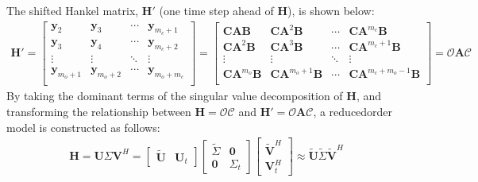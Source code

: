 \documentclass[letterpaper,10pt,english]{sphinxmanual}
\begin{document}
\sphinxAtStartPar
The shifted Hankel matrix, \(\mathbf{H'}\) (one time step ahead of
\(\mathbf{H}\)), is shown below:
\begin{equation*}
\begin{split}\mathbf{H'}
=
\begin{bmatrix}
    \mathbf{y}_{2}       & \mathbf{y}_{3}        & \cdots   & \mathbf{y}_{m_{c}+1}        \\
    \mathbf{y}_{3}       & \mathbf{y}_{4}        & \cdots   & \mathbf{y}_{m_{c}+2}        \\
    \vdots               & \vdots                & \ddots   & \vdots                      \\
    \mathbf{y}_{m_{o}+1} & \mathbf{y}_{m_{o}+2}  & \cdots   & \mathbf{y}_{m_{o}+m_{c}}    \\
\end{bmatrix}
=
\begin{bmatrix}
    \mathbf{CAB}                    & \mathbf{CA}^{2}\mathbf{B}     & \cdots  & \mathbf{CA}^{m_{c}}\mathbf{B}          \\
    \mathbf{CA}^{2}\mathbf{B}       & \mathbf{CA}^{3}\mathbf{B}     & \cdots  & \mathbf{CA}^{m_{c}+1}\mathbf{B}        \\
    \vdots                          & \vdots                        & \ddots  & \vdots                                 \\
    \mathbf{CA}^{m_{o}}\mathbf{B}   & \mathbf{CA}^{m_{o}+1}\mathbf{B} & \cdots  & \mathbf{CA}^{m_{c}+m_{o}-1}\mathbf{B}\\
\end{bmatrix}
=
\mathbf{\mathcal{O}A\mathcal{C}}\end{split}
\end{equation*}
\sphinxAtStartPar
By taking the dominant terms of the singular value decomposition
of \(\mathbf{H}\), and transforming the relationship between
\(\mathbf{H} = \mathbf{\mathcal{OC}}\) and
\(\mathbf{H'} = \mathbf{\mathcal{O}A\mathcal{C}}\), a reduced\sphinxhyphen{}order
model is constructed as follows:
\begin{equation*}
\begin{split}\mathbf{H} = \mathbf{U}\Sigma\mathbf{V}^{H} =
\begin{bmatrix} \mathbf{\tilde{U}} & \mathbf{U}_{t} \end{bmatrix}
\begin{bmatrix} \tilde{\Sigma} & \mathbf{0} \\ \mathbf{0} & \Sigma_{t} \end{bmatrix}
\begin{bmatrix} \mathbf{\tilde{V}}^{H} \\ \mathbf{V}_{t}^{H} \end{bmatrix}
\approx \mathbf{\tilde{U}}\tilde{\Sigma}\mathbf{\tilde{V}}^{H}\end{split}
\end{equation*}
\end{document}
